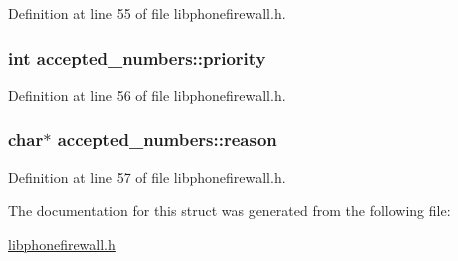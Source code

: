 Definition at line 55 of file libphonefirewall.h.\hypertarget{structaccepted__numbers_709eeeb6f0ffed0613b91b5650a38a6b}{
\subsubsection{\setlength{\rightskip}{0pt plus 5cm}int {\bf accepted\_\-numbers::priority}}}
\label{structaccepted__numbers_709eeeb6f0ffed0613b91b5650a38a6b}




Definition at line 56 of file libphonefirewall.h.\hypertarget{structaccepted__numbers_7d0d86f3bc0a4e9a70a033dfb8bd735f}{
\subsubsection{\setlength{\rightskip}{0pt plus 5cm}char$\ast$ {\bf accepted\_\-numbers::reason}}}
\label{structaccepted__numbers_7d0d86f3bc0a4e9a70a033dfb8bd735f}




Definition at line 57 of file libphonefirewall.h.

The documentation for this struct was generated from the following file:\begin{CompactItemize}
\item 
\hyperlink{libphonefirewall_8h}{libphonefirewall.h}\end{CompactItemize}
